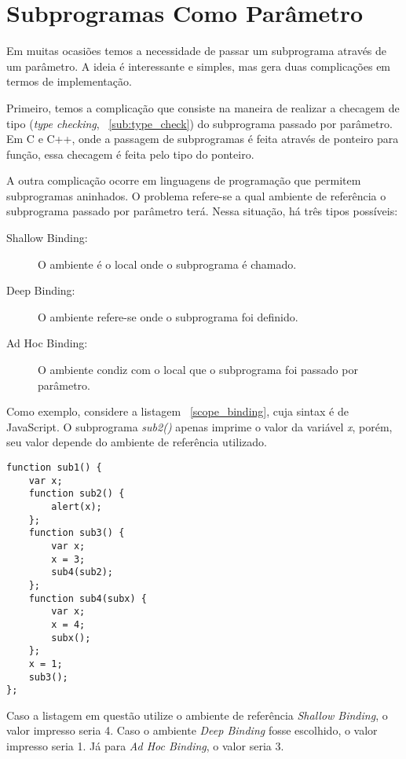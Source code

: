 
\section{Subprogramas Como Parâmetro} %
\label{sec:subprogramas_como_parametro}
Em muitas ocasiões temos a necessidade de passar um subprograma através de um parâmetro. A ideia é interessante e simples, mas gera duas complicações em termos de implementação.

Primeiro, temos a complicação que consiste na maneira de realizar a checagem de tipo (\textit{type checking}, ~\ref{sub:type_check}) do subprograma passado por parâmetro. Em C e C++, onde a passagem de subprogramas é feita através de ponteiro para função, essa checagem é feita pelo tipo do ponteiro.

A outra complicação ocorre em linguagens de programação que permitem subprogramas aninhados. O problema refere-se a qual ambiente de referência o subprograma passado por parâmetro terá. Nessa situação, há três tipos possíveis:
\begin{description}
	\item[Shallow Binding:] O ambiente é o local onde o subprograma é chamado.
	\item[Deep Binding:] O ambiente refere-se onde o subprograma foi definido.
	\item[Ad Hoc Binding:] O ambiente condiz com o local que o subprograma foi passado por parâmetro.
\end{description}

Como exemplo, considere a listagem ~\ref{scope_binding}, cuja sintax é de JavaScript. O subprograma \textit{sub2()} apenas imprime o valor da variável \textit{x}, porém, seu valor depende do ambiente de referência utilizado. 

\begin{lstlisting}[caption=Código retirado de \cite{sebesta}]
function sub1() {
	var x;
	function sub2() {
		alert(x);
	};
	function sub3() {
		var x;
		x = 3;
		sub4(sub2);
	};
	function sub4(subx) {
		var x;
		x = 4;
		subx();
	};
	x = 1;
	sub3();
};
\end{lstlisting}
\label{scope_binding}

Caso a listagem em questão utilize o ambiente de referência \textit{Shallow Binding}, o valor impresso seria 4. Caso o ambiente \textit{Deep Binding} fosse escolhido, o valor impresso seria 1. Já para \textit{Ad Hoc Binding}, o valor seria 3.
